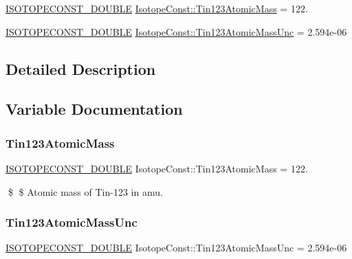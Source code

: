 \begin{DoxyCompactItemize}
\item 
\mbox{\hyperlink{group___isotope_const-_macros_ga8f45a7272ce02c0b4c65c44636ed719a}{I\+S\+O\+T\+O\+P\+E\+C\+O\+N\+S\+T\+\_\+\+D\+O\+U\+B\+LE}} \mbox{\hyperlink{group___isotope_const-_tin-_sn123_ga32320c49670d1c58657eb7b9d8a015dd}{Isotope\+Const\+::\+Tin123\+Atomic\+Mass}} = 122.
\item 
\mbox{\hyperlink{group___isotope_const-_macros_ga8f45a7272ce02c0b4c65c44636ed719a}{I\+S\+O\+T\+O\+P\+E\+C\+O\+N\+S\+T\+\_\+\+D\+O\+U\+B\+LE}} \mbox{\hyperlink{group___isotope_const-_tin-_sn123_ga89d6a595f53d6f44cd3d69186fa37237}{Isotope\+Const\+::\+Tin123\+Atomic\+Mass\+Unc}} = 2.\+594e-\/06
\end{DoxyCompactItemize}


\subsection{Detailed Description}


\subsection{Variable Documentation}
\mbox{\label{group___isotope_const-_tin-_sn123_ga32320c49670d1c58657eb7b9d8a015dd}} 
\subsubsection{\texorpdfstring{Tin123\+Atomic\+Mass}{Tin123AtomicMass}}
{\footnotesize\ttfamily \mbox{\hyperlink{group___isotope_const-_macros_ga8f45a7272ce02c0b4c65c44636ed719a}{I\+S\+O\+T\+O\+P\+E\+C\+O\+N\+S\+T\+\_\+\+D\+O\+U\+B\+LE}} Isotope\+Const\+::\+Tin123\+Atomic\+Mass = 122.}

\$ \$ Atomic mass of Tin-\/123 in amu. \mbox{\label{group___isotope_const-_tin-_sn123_ga89d6a595f53d6f44cd3d69186fa37237}} 
\subsubsection{\texorpdfstring{Tin123\+Atomic\+Mass\+Unc}{Tin123AtomicMassUnc}}
{\footnotesize\ttfamily \mbox{\hyperlink{group___isotope_const-_macros_ga8f45a7272ce02c0b4c65c44636ed719a}{I\+S\+O\+T\+O\+P\+E\+C\+O\+N\+S\+T\+\_\+\+D\+O\+U\+B\+LE}} Isotope\+Const\+::\+Tin123\+Atomic\+Mass\+Unc = 2.\+594e-\/06}

